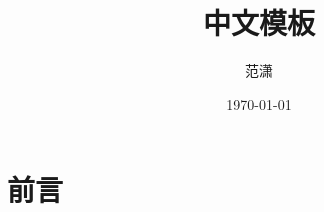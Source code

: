 \documentclass[a4paper]{report}
\author{范潇}
\title{中文模板}
\date{\today}
\begin{document}
\tableofcontents
\maketitle
\chapter{前言}




\end{document}
